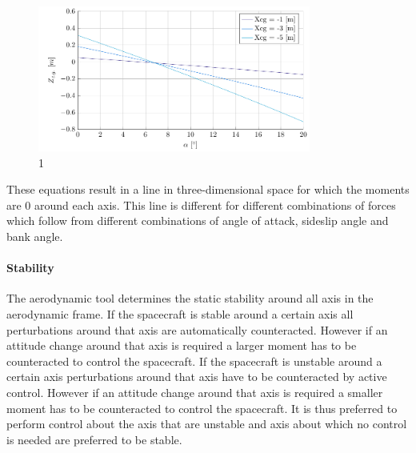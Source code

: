 \begin{figure}[h]
	\centering
	\includegraphics[width=0.8\textwidth]{./Figure/control/moment}
	\caption{1}
	\label{fig:}
\end{figure}

These equations result in a line in three-dimensional space for which the moments are 0 around each axis. This line is different for different combinations of forces which follow from different combinations of angle of attack, sideslip angle and bank angle.

\paragraph{Stability}
\label{control:stab}
The aerodynamic tool determines the static stability around all axis in the aerodynamic frame. If the spacecraft is stable around a certain axis all perturbations around that axis are automatically counteracted. However if an attitude change around that axis is required a larger moment has to be counteracted to control the spacecraft.  If the spacecraft is unstable around a certain axis perturbations around that axis have to be counteracted by active control. However if an attitude change around that axis is required a smaller moment has to be counteracted to control the spacecraft. It is thus preferred to perform control about the axis that are unstable and axis about which no control is needed are preferred to be stable.

